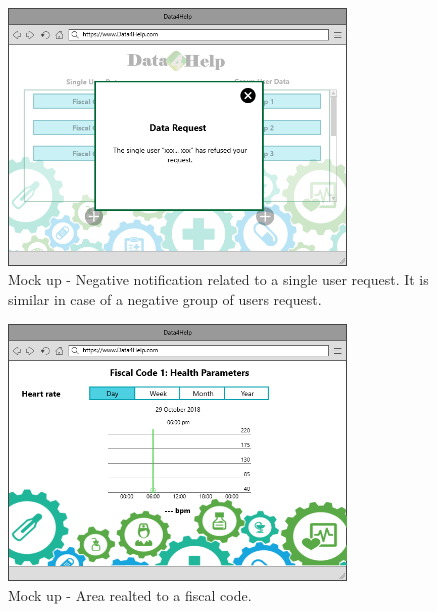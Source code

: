 \FloatBarrier
\begin{figure}[h!]
	\centering
	\includegraphics[width=0.80\textwidth]{./pictures/negative_request.png}\par
	\caption{Mock up - Negative notification related to a single user request. It is similar in case of a negative group of users request.}
\end{figure}
\FloatBarrier
\begin{figure}[h!]
	\centering
	\includegraphics[width=0.80\textwidth]{./pictures/single_user_param.png}\par
	\caption{Mock up - Area realted to a fiscal code.}
\end{figure}
\FloatBarrier

